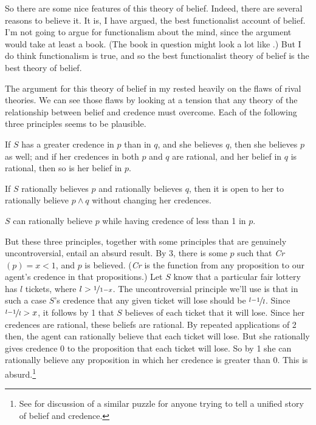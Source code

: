 So there are some nice features of this theory of belief. Indeed, there are several reasons to believe it. It is, I have argued, the best functionalist account of belief. I'm not going to argue for functionalism about the mind, since the argument would take at least a book. (The book in question might look a lot like \cite{DBMJackson2007}.) But I do think functionalism is true, and so the best functionalist theory of belief is the best theory of belief.

The argument for this theory of belief in my  \citeyearpar{Weatherson2005-WEACWD} rested heavily on the flaws of rival theories. We can see those flaws by looking at a tension that any theory of the relationship between belief and credence must overcome. Each of the following three principles seems to be plausible.

\begin{enumerate*}
\item If $S$ has a greater credence in $p$ than in $q$, and she believes $q$, then she believes $p$ as well; and if her credences in both $p$ and $q$ are rational, and her belief in $q$ is rational, then so is her belief in $p$.
\item If $S$ rationally believes $p$ and rationally believes $q$, then it is open to her to rationally believe $p \wedge q$ without changing her credences.
\item $S$ can rationally believe $p$ while having credence of less than 1 in $p$.
\end{enumerate*}

\noindent But these three principles, together with some principles that are genuinely uncontroversial, entail an absurd result. By 3, there is some $p$ such that \textit{Cr}$(p) = x < 1$, and $p$ is believed. (\textit{Cr} is the function from any proposition to our agent's credence in that propositions.) Let $S$ know that a particular fair lottery has $l$ tickets, where $l > \nicefrac{1}{1-x}$. The uncontroversial principle we'll use is that in such a case $S$'s credence that any given ticket will lose should be $\nicefrac{l-1}{l}$. Since $\nicefrac{l-1}{l} > x$, it follows by 1 that $S$ believes of each ticket that it will lose. Since her credences are rational, these beliefs are rational. By repeated applications of 2 then, the agent can rationally believe that each ticket will lose. But she rationally gives credence 0 to the proposition that each ticket will lose. So by 1 she can rationally believe any proposition in which her credence is greater than 0. This is absurd.\footnote{See \cite{Sturgeon2008-STURAT} for discussion of a similar puzzle for anyone trying to tell a unified story of belief and credence.}

